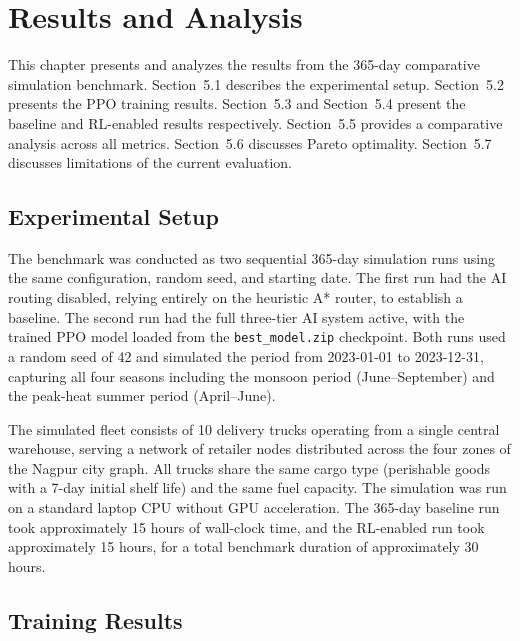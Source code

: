 \chapter{Results and Analysis}

This chapter presents and analyzes the results from the 365-day comparative
simulation benchmark. Section~5.1 describes the experimental setup. Section~5.2
presents the PPO training results. Section~5.3 and Section~5.4 present the
baseline and RL-enabled results respectively. Section~5.5 provides a comparative
analysis across all metrics. Section~5.6 discusses Pareto optimality.
Section~5.7 discusses limitations of the current evaluation.

\section{Experimental Setup}

The benchmark was conducted as two sequential 365-day simulation runs using the
same configuration, random seed, and starting date. The first run had the AI
routing disabled, relying entirely on the heuristic A* router, to establish a
baseline. The second run had the full three-tier AI system active, with the
trained PPO model loaded from the \texttt{best\_model.zip} checkpoint. Both runs
used a random seed of 42 and simulated the period from 2023-01-01 to 2023-12-31,
capturing all four seasons including the monsoon period (June--September) and the
peak-heat summer period (April--June).

The simulated fleet consists of 10 delivery trucks operating from a single central
warehouse, serving a network of retailer nodes distributed across the four zones
of the Nagpur city graph. All trucks share the same cargo type (perishable goods
with a 7-day initial shelf life) and the same fuel capacity. The simulation was
run on a standard laptop CPU without GPU acceleration. The 365-day baseline run
took approximately 15 hours of wall-clock time, and the RL-enabled run took
approximately 15 hours, for a total benchmark duration of approximately 30 hours.

\section{Training Results}

